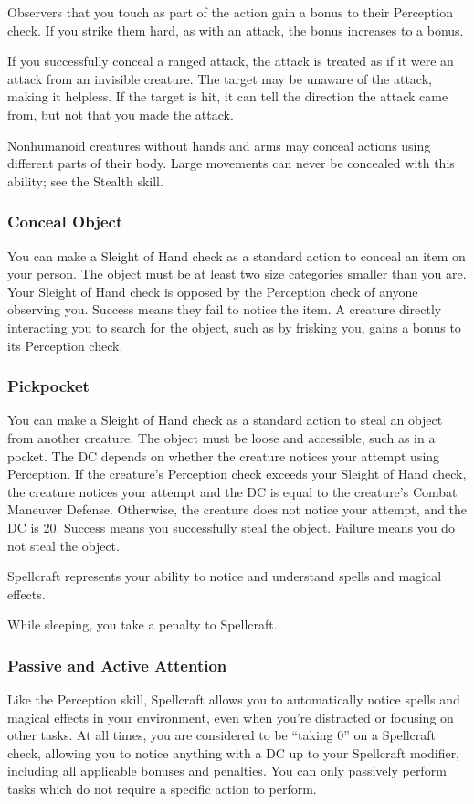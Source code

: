 Observers that you touch as part of the action gain a  bonus to their Perception check. If you strike them hard, as with an attack, the bonus increases to a  bonus.

If you successfully conceal a ranged attack, the attack is treated as if it were an attack from an invisible creature. The target may be unaware of the attack, making it helpless. If the target is hit, it can tell the direction the attack came from, but not that you made the attack.

Nonhumanoid creatures without hands and arms may conceal actions using different parts of their body. Large movements can never be concealed with this ability; see the Stealth skill.

\subsubsection{Conceal Object}
You can make a Sleight of Hand check as a standard action to conceal an item on your person. The object must be at least two size categories smaller than you are. Your Sleight of Hand check is opposed by the Perception check of anyone observing you. Success means they fail to notice the item. A creature directly interacting you to search for the object, such as by frisking you, gains a  bonus to its Perception check.

\subsubsection{Pickpocket}
You can make a Sleight of Hand check as a standard action to steal an object from another creature. The object must be loose and accessible, such as in a pocket. The DC depends on whether the creature notices your attempt using Perception. If the creature's Perception check exceeds your Sleight of Hand check, the creature notices your attempt and the DC is equal to the creature's Combat Maneuver Defense. Otherwise, the creature does not notice your attempt, and the DC is 20. Success means you successfully steal the object. Failure means you do not steal the object.

Spellcraft represents your ability to notice and understand spells and magical effects.

While sleeping, you take a  penalty to Spellcraft.

\subsubsection{Passive and Active Attention}\label{Spellcraft:Passive and Active Attention}
Like the Perception skill, Spellcraft allows you to automatically notice spells and magical effects in your environment, even when you're distracted or focusing on other tasks. At all times, you are considered to be ``taking 0'' on a Spellcraft check, allowing you to notice anything with a DC up to your Spellcraft modifier, including all applicable bonuses and penalties. You can only passively perform tasks which do not require a specific action to perform.

